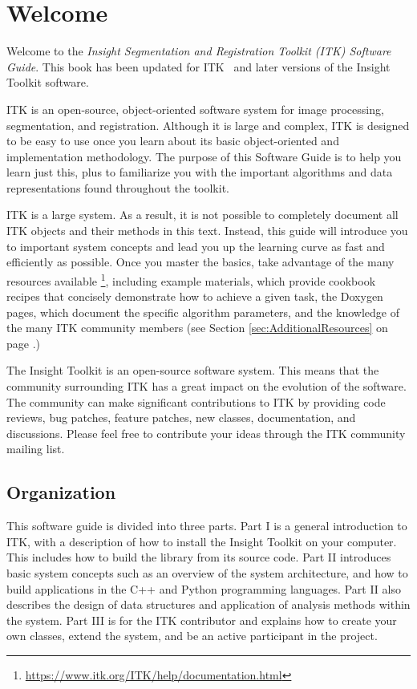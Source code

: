 \chapter{Welcome}
\label{chapter:Introduction}

Welcome to the \emph{Insight Segmentation and Registration Toolkit (ITK)
Software Guide}. This book has been updated for ITK \ITKVERSIONMAJORMINOR
\ and later versions of the Insight Toolkit software.

ITK is an open-source, object-oriented software system for image processing,
segmentation, and registration. Although it is large and complex, ITK is
designed to be easy to use once you learn about its basic object-oriented and
implementation methodology. The purpose of this Software Guide is
to help you learn just this, plus to familiarize you with the important
algorithms and data representations found throughout the toolkit.

ITK is a large system. As a result, it is not possible to completely document
all ITK objects and their methods in this text. Instead, this guide will
introduce you to important system concepts and lead you up the learning curve
as fast and efficiently as possible. Once you master the basics, take
advantage of the many resources available
\footnote{\url{https://www.itk.org/ITK/help/documentation.html}}, including example
materials, which provide cookbook recipes that concisely demonstrate how to
achieve a given task, the Doxygen pages, which document the specific algorithm
parameters, and the knowledge of the many ITK community members (see Section
\ref{sec:AdditionalResources} on page \pageref{sec:AdditionalResources}.)

The Insight Toolkit is an open-source software system. This means that the
community surrounding ITK has a great impact on the evolution of the software.
The community can make significant contributions to ITK by providing code
reviews, bug patches, feature patches, new classes, documentation, and
discussions. Please feel free to contribute your ideas through the ITK
community mailing list.

\section{Organization}
\label{sec:Organization}

This software guide is divided into three parts. Part I is a general
introduction to ITK, with a description of how to install the Insight
Toolkit on your computer. This includes how to build the library from its
source code. Part II introduces basic system concepts such as an overview of
the system architecture, and how to build applications in the C++ and Python
programming languages. Part II also describes the design of data structures
and application of analysis methods within the system.  Part III is for the
ITK contributor and explains how to create your own classes, extend the
system, and be an active participant in the project.

